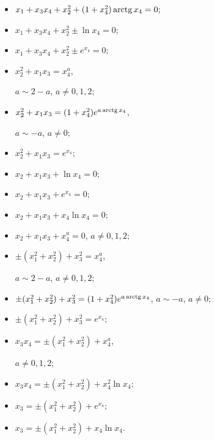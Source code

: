 \begin{thm}
\begin{itemize}
\item[$(11)$] $x_1+x_3x_4+ x_2^2+(1+x_4^2)\operatorname{arctg} x_4=0;$


\item[$(12)$] $x_1+x_3x_4+ x_2^2\pm\ln x_4=0;$


\item[$(13)$] $x_1+x_3x_4+ x_2^2\pm e^{x_4}=0;$


\item[$(14)$] $x_2^2+x_1x_3=x_4^{a}$, 


$a\sim 2-a$, $a\ne0,1,2;$


\item[$(15)$] $x_2^2+x_1x_3=(1+x_4^2)e^{a\operatorname{arctg} x_4}$,


$a\sim -a$, $a\ne0;$


\item[$(16)$] $x_2^2+x_1x_3=e^{x_4};$


\item[$(17)$] $x_2+x_1x_3+\ln x_4=0;$


\item[$(18)$] $x_2+x_1x_3+e^{ x_4}=0;$


\item[$(19)$] $x_2+x_1x_3+x_4\ln x_4=0;$


\item[$(20)$] $x_2+x_1x_3+ x_4^{a}=0$, $a\ne 0,1,2;$


\item[$(21)$] $\pm(x_1^2+x_2^2)+x_3^2=x_4^{a}$, 


$a\sim 2-a$, $a\ne0,1,2;$


\item[$(22)$] $\pm(x_1^2+x_2^2)+x_3^2=(1+x_4^2)e^{a\arctg


x_4}$, $a\sim -a$, $a\ne0;$


\item[$(23)$] $\pm(x_1^2+x_2^2)+x_3^2=e^{ x_4};$


\item[$(24)$] $x_3x_4=\pm(x_1^2+x_2^2)+x_4^{a}$, 


$a\ne 0,1,2;$


\item[$(25)$] $x_3x_4=\pm(x_1^2+x_2^2)+x_4^2\ln x_4;$


\item[$(26)$] $x_3=\pm(x_1^2+x_2^2)+e^{ x_4};$


\item[$(27)$] $x_3=\pm(x_1^2+x_2^2)+x_4\ln x_4$.


\end{itemize}


\end{thm}





